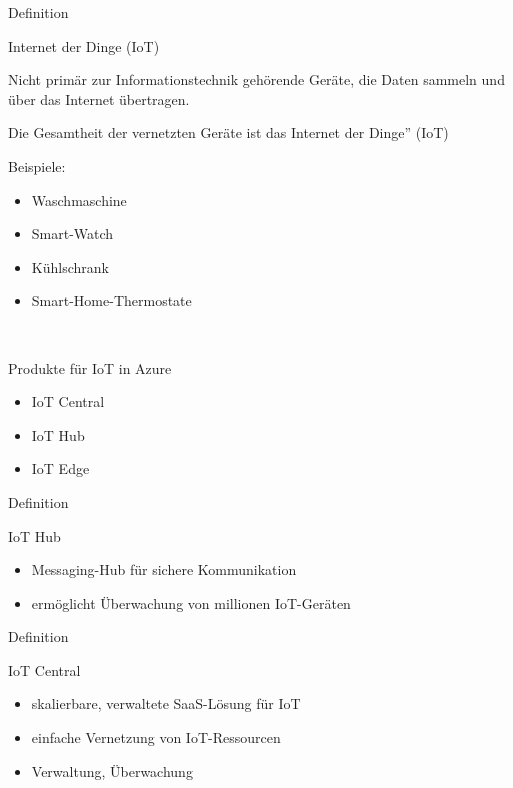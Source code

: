 \documentclass{scrartcl}
\newenvironment{flashcard}[2][]{%
    #1
    \vfill
    \centerline{\Large{#2}}
    \vfill
\newpage
}
{\newpage}
\begin{document}
    \begin{flashcard}[Definition]{Internet der Dinge (IoT)}
        Nicht primär zur Informationstechnik gehörende Geräte, die Daten sammeln und über das Internet übertragen.

        \vspace{5mm}
        Die Gesamtheit der vernetzten Geräte ist das Internet der Dinge'' (IoT)

        \vspace{5mm}
        Beispiele:
        \begin{itemize}
            \item Waschmaschine
            \item Smart-Watch
            \item Kühlschrank
            \item Smart-Home-Thermostate
        \end{itemize}

    \end{flashcard}

    \begin{flashcard}[\ ]{Produkte für IoT in Azure}
        \begin{itemize}
            \item IoT Central
            \item IoT Hub
            \item IoT Edge
        \end{itemize}

    \end{flashcard}

    \begin{flashcard}[Definition]{IoT Hub}
        \begin{itemize}
            \item Messaging-Hub für sichere Kommunikation
            \item ermöglicht Überwachung von millionen IoT-Geräten
        \end{itemize}
    \end{flashcard}

    \begin{flashcard}[Definition]{IoT Central}
        \begin{itemize}
            \item skalierbare, verwaltete SaaS-Lösung für IoT
            \item einfache Vernetzung von IoT-Ressourcen
            \item Verwaltung, Überwachung
        \end{itemize}
    \end{flashcard}
\end{document}
